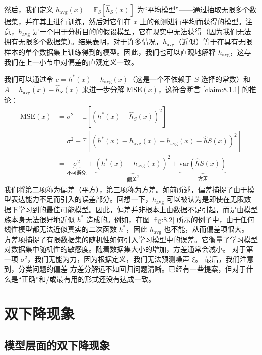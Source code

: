 然后，我们定义 $h_{\text{avg}}(x) = \mathbb{E}_S[\hat{h}_S(x)]$ 为“平均模型”——通过抽取无限多个数据集，并在其上进行训练，然后对它们在 $x$ 上的预测进行平均而获得的模型。注意，$h_{\text{avg}}$ 是一个用于分析目的的假设模型，它在现实中无法获得（因为我们无法拥有无限多个数据集）。结果表明，对于许多情况，$h_{\text{avg}}$（近似）等于在具有无限样本的单个数据集上训练得到的模型。因此，我们也可以直观地解释 $h_{\text{avg}}$，这与我们在上一小节中对偏差的直观定义一致。

我们可以通过令 $c = h^*(x) - h_{\text{avg}}(x)$（这是一个不依赖于 $S$ 选择的常数）和 $A = h_{\text{avg}}(x) - \hat{h}_S(x)$ 来进一步分解 $\text{MSE}(x)$，这符合断言 \ref{claim:8.1.1} 的推论：
\begin{align}
    \text{MSE}(x) &= \sigma^2 + \mathbb{E}[(h^*(x) - \hat{h}_S(x))^2] \label{eq:8.5} \\
    &= \sigma^2 + \mathbb{E}[(h^*(x) - h_{\text{avg}}(x) + h_{\text{avg}}(x) - \hat{h}S(x))^2] \label{eq:8.6} \\
    &= \underbrace{\sigma^2}_{\text{不可避免}} + \underbrace{(h^*(x) - h_{\text{avg}}(x))^2}_{\text{偏差}^2} + \underbrace{\text{var}(\hat{h}S(x))}_{\text{方差}} \label{eq:8.7}
\end{align}
我们将第二项称为偏差（平方），第三项称为方差。如前所述，偏差捕捉了由于模型表达能力不足而引入的误差部分。回想一下，$h_{\text{avg}}$ 可以被认为是即使在无限数据下学习到的最佳可能模型。因此，偏差并非根本上由数据不足引起，而是由模型族本身无法很好地近似 $h^*$ 造成的。例如，在图 \ref{fig:8.2} 所示的例子中，由于任何线性模型都无法近似真实的二次函数 $h^*$，因此 $h_{\text{avg}}$ 也不能，从而偏差项很大。
方差项捕捉了有限数据集的随机性如何引入学习模型中的误差。它衡量了学习模型对数据集中随机性的敏感度。随着数据集大小的增加，方差通常会减小。
对于第一项 $\sigma^2$，我们无能为力，因为根据定义，我们无法预测噪声 $\xi$。
最后，我们注意到，分类问题的偏差-方差分解远不如回归问题清晰。已经有一些提案，但对于什么是“正确”和/或最有用的形式还没有达成一致。


\section{双下降现象}\label{sec:8.2}

\subsection*{模型层面的双下降现象}

